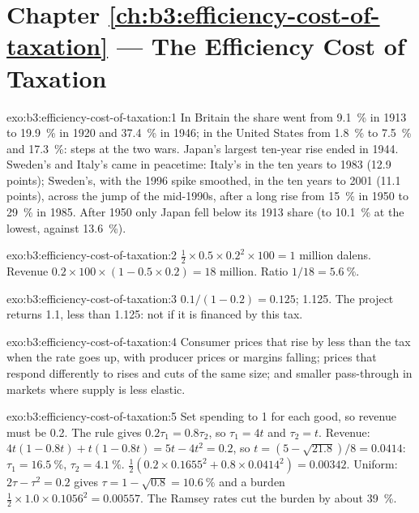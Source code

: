 \section*{Chapter \ref{ch:b3:efficiency-cost-of-taxation} --- The Efficiency Cost of Taxation}

\begin{solution}{exo:b3:efficiency-cost-of-taxation:1}
In Britain the share went from 9.1~\% in 1913 to 19.9~\% in 1920 and 37.4~\% in 1946; in the
United States from 1.8~\% to 7.5~\% and 17.3~\%: steps at the two wars. Japan's largest
ten-year rise ended in 1944. Sweden's and Italy's came in peacetime: Italy's in the ten
years to 1983 (12.9 points); Sweden's, with the 1996 spike smoothed, in the ten years
to 2001 (11.1 points), across the jump of the mid-1990s, after a long rise from 15~\%
in 1950 to 29~\% in 1985. After 1950 only Japan fell below its 1913 share (to 10.1~\% at
the lowest, against 13.6~\%). %
\end{solution}

\begin{solution}{exo:b3:efficiency-cost-of-taxation:2}
 $\tfrac12 \times 0.5 \times 0.2^2 \times 100 = 1$ million dalens. Revenue $0.2 \times 100 \times (1 - 0.5 \times 0.2) = 18$
million. Ratio $1/18 = 5.6~\%$.
\end{solution}

\begin{solution}{exo:b3:efficiency-cost-of-taxation:3}
 $0.1/(1 - 0.2) = 0.125$;  1.125. The
project returns 1.1, less than 1.125: not if it is financed by this tax.
\end{solution}

\begin{solution}{exo:b3:efficiency-cost-of-taxation:4}
Consumer prices that rise by less than the tax when the rate goes up, with
producer prices or margins falling; prices that respond differently to rises and
cuts of the same size; and smaller pass-through in markets where supply is less
elastic.
\end{solution}

\begin{solution}{exo:b3:efficiency-cost-of-taxation:5}
Set spending to 1 for each good, so revenue must be 0.2. The rule gives $0.2\tau_1 = 0.8\tau_2$, so
$\tau_1 = 4t$ and $\tau_2 = t$. Revenue: $4t(1 - 0.8t) + t(1 - 0.8t) = 5t - 4t^2 = 0.2$, so $t = (5 - \sqrt{21.8})/8 =
0.0414$: $\tau_1 = 16.5~\%$, $\tau_2 = 4.1~\%$.  $\tfrac12(0.2 \times 0.1655^2 + 0.8 \times 0.0414^2) = 0.00342$.
Uniform: $2\tau - \tau^2 = 0.2$ gives $\tau = 1 - \sqrt{0.8} = 10.6~\%$ and a burden $\tfrac12 \times 1.0 \times 0.1056^2 = 0.00557$. The
Ramsey rates cut the burden by about 39~\%.
\end{solution}

